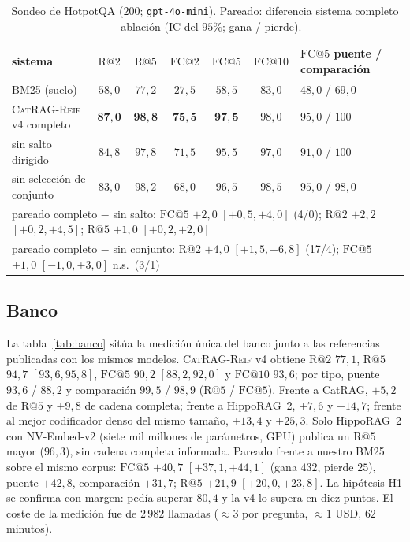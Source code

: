 \documentclass[11pt,a4paper]{article}
\newcommand{\sys}{\textsc{CatRAG-Reif}}
\newcommand{\hippo}{HippoRAG~2}
\begin{document}
\begin{table}[t]
\centering\footnotesize\setlength{\tabcolsep}{4pt}
\caption{Sondeo de HotpotQA ($200$; \texttt{gpt-4o-mini}). Pareado: diferencia
sistema completo $-$ ablación (IC del $95\%$; gana / pierde).}
\label{tab:sondeo}
\begin{tabular}{lcccccl}
\toprule
sistema & $\mathrm{R@}2$ & $\mathrm{R@}5$ & $\mathrm{FC@}2$ & $\mathrm{FC@}5$ & $\mathrm{FC@}10$ & $\mathrm{FC@}5$ puente / comparación\\
\midrule
BM25 (suelo) & $58{,}0$ & $77{,}2$ & $27{,}5$ & $58{,}5$ & $83{,}0$ & $48{,}0$ / $69{,}0$\\
\sys{} v4 completo & $\mathbf{87{,}0}$ & $\mathbf{98{,}8}$ & $\mathbf{75{,}5}$ & $\mathbf{97{,}5}$ & $98{,}0$ & $95{,}0$ / $100$\\
\quad sin salto dirigido & $84{,}8$ & $97{,}8$ & $71{,}5$ & $95{,}5$ & $97{,}0$ & $91{,}0$ / $100$\\
\quad sin selección de conjunto & $83{,}0$ & $98{,}2$ & $68{,}0$ & $96{,}5$ & $98{,}5$ & $95{,}0$ / $98{,}0$\\
\midrule
\multicolumn{7}{l}{pareado completo $-$ sin salto: $\mathrm{FC@}5$ $+2{,}0$ $[+0{,}5,+4{,}0]$ (4/0); $\mathrm{R@}2$ $+2{,}2$ $[+0{,}2,+4{,}5]$; $\mathrm{R@}5$ $+1{,}0$ $[+0{,}2,+2{,}0]$}\\
\multicolumn{7}{l}{pareado completo $-$ sin conjunto: $\mathrm{R@}2$ $+4{,}0$ $[+1{,}5,+6{,}8]$ (17/4); $\mathrm{FC@}5$ $+1{,}0$ $[-1{,}0,+3{,}0]$ n.s.\ (3/1)}\\
\bottomrule
\end{tabular}
\end{table}

\subsection{Banco}
\label{sec:banco}

La tabla~\ref{tab:banco} sitúa la medición única del banco junto a las
referencias publicadas con los mismos modelos. \sys{} v4 obtiene
$\mathrm{R@}2$ $77{,}1$, $\mathrm{R@}5$ $94{,}7$ $[93{,}6,95{,}8]$,
$\mathrm{FC@}5$ $90{,}2$ $[88{,}2,92{,}0]$ y $\mathrm{FC@}10$ $93{,}6$; por
tipo, puente $93{,}6$ / $88{,}2$ y comparación $99{,}5$ / $98{,}9$
($\mathrm{R@}5$ / $\mathrm{FC@}5$). Frente a CatRAG, $+5{,}2$ de
$\mathrm{R@}5$ y $+9{,}8$ de cadena completa; frente a \hippo{}, $+7{,}6$ y
$+14{,}7$; frente al mejor codificador denso del mismo tamaño, $+13{,}4$ y
$+25{,}3$. Solo \hippo{} con NV-Embed-v2 (siete mil millones de parámetros,
GPU) publica un $\mathrm{R@}5$ mayor ($96{,}3$), sin cadena completa
informada. Pareado frente a nuestro BM25 sobre el mismo corpus: $\mathrm{FC@}5$
$+40{,}7$ $[+37{,}1,+44{,}1]$ (gana $432$, pierde $25$), puente $+42{,}8$,
comparación $+31{,}7$; $\mathrm{R@}5$ $+21{,}9$ $[+20{,}0,+23{,}8]$. La
hipótesis H1 se confirma con margen: pedía superar $80{,}4$ y la v4 lo
supera en diez puntos. El coste de la medición fue de $2\,982$ llamadas
($\approx 3$ por pregunta, $\approx 1$ USD, $62$ minutos).
\end{document}
